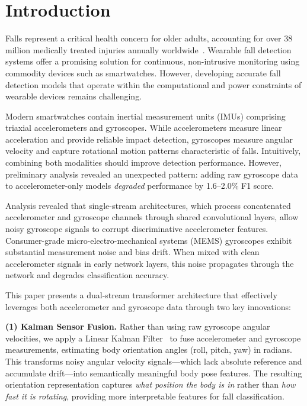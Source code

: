 \documentclass[journal,article,submit,pdftex,moreauthors]{../Definitions/mdpi}
\begin{document}
\section{Introduction}
\label{sec:introduction}

Falls represent a critical health concern for older adults, accounting for over 38 million medically treated injuries annually worldwide~\cite{who2021falls}. Wearable fall detection systems offer a promising solution for continuous, non-intrusive monitoring using commodity devices such as smartwatches. However, developing accurate fall detection models that operate within the computational and power constraints of wearable devices remains challenging.

Modern smartwatches contain inertial measurement units (IMUs) comprising triaxial accelerometers and gyroscopes. While accelerometers measure linear acceleration and provide reliable impact detection, gyroscopes measure angular velocity and capture rotational motion patterns characteristic of falls. Intuitively, combining both modalities should improve detection performance. However, preliminary analysis revealed an unexpected pattern: adding raw gyroscope data to accelerometer-only models \textit{degraded} performance by 1.6--2.0\% F1 score.

Analysis revealed that single-stream architectures, which process concatenated accelerometer and gyroscope channels through shared convolutional layers, allow noisy gyroscope signals to corrupt discriminative accelerometer features. Consumer-grade micro-electro-mechanical systems (MEMS) gyroscopes exhibit substantial measurement noise and bias drift. When mixed with clean accelerometer signals in early network layers, this noise propagates through the network and degrades classification accuracy.

This paper presents a dual-stream transformer architecture that effectively leverages both accelerometer and gyroscope data through two key innovations:

\textbf{(1) Kalman Sensor Fusion.} Rather than using raw gyroscope angular velocities, we apply a Linear Kalman Filter~\cite{kalman1960new} to fuse accelerometer and gyroscope measurements, estimating body orientation angles (roll, pitch, yaw) in radians. This transforms noisy angular velocity signals---which lack absolute reference and accumulate drift---into semantically meaningful body pose features. The resulting orientation representation captures \textit{what position the body is in} rather than \textit{how fast it is rotating}, providing more interpretable features for fall classification.
\end{document}
